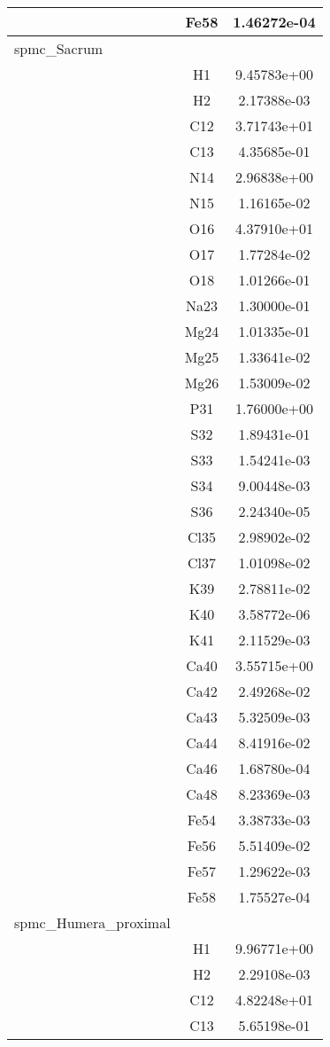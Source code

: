 \begin{centering}
\begin{longtable}{l c c}
& Fe58 & 1.46272e-04 \\ 
\hline
spmc_Sacrum & & \\
\hline
& H1 & 9.45783e+00 \\ 
& H2 & 2.17388e-03 \\ 
& C12 & 3.71743e+01 \\ 
& C13 & 4.35685e-01 \\ 
& N14 & 2.96838e+00 \\ 
& N15 & 1.16165e-02 \\ 
& O16 & 4.37910e+01 \\ 
& O17 & 1.77284e-02 \\ 
& O18 & 1.01266e-01 \\ 
& Na23 & 1.30000e-01 \\ 
& Mg24 & 1.01335e-01 \\ 
& Mg25 & 1.33641e-02 \\ 
& Mg26 & 1.53009e-02 \\ 
& P31 & 1.76000e+00 \\ 
& S32 & 1.89431e-01 \\ 
& S33 & 1.54241e-03 \\ 
& S34 & 9.00448e-03 \\ 
& S36 & 2.24340e-05 \\ 
& Cl35 & 2.98902e-02 \\ 
& Cl37 & 1.01098e-02 \\ 
& K39 & 2.78811e-02 \\ 
& K40 & 3.58772e-06 \\ 
& K41 & 2.11529e-03 \\ 
& Ca40 & 3.55715e+00 \\ 
& Ca42 & 2.49268e-02 \\ 
& Ca43 & 5.32509e-03 \\ 
& Ca44 & 8.41916e-02 \\ 
& Ca46 & 1.68780e-04 \\ 
& Ca48 & 8.23369e-03 \\ 
& Fe54 & 3.38733e-03 \\ 
& Fe56 & 5.51409e-02 \\ 
& Fe57 & 1.29622e-03 \\ 
& Fe58 & 1.75527e-04 \\ 
\hline
spmc_Humera_proximal & & \\
\hline
& H1 & 9.96771e+00 \\ 
& H2 & 2.29108e-03 \\ 
& C12 & 4.82248e+01 \\ 
& C13 & 5.65198e-01 \\ 

\end{longtable}
\end{centering}
